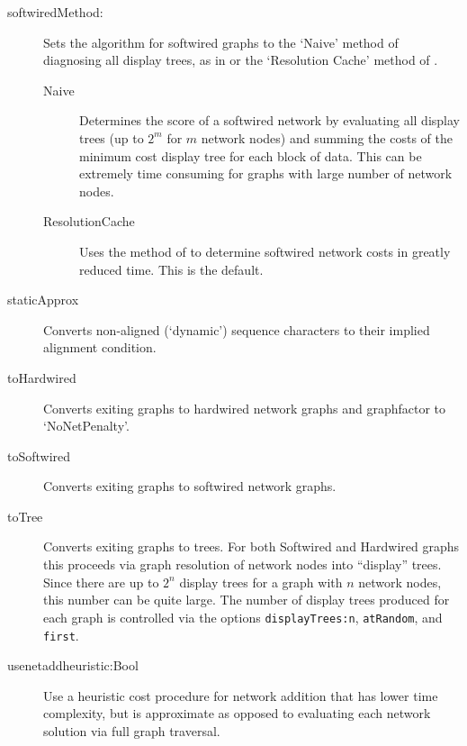 \begin{description}
		 \item[softwiredMethod:] Sets the algorithm for softwired graphs to the 
		 `Naive' method of diagnosing all display trees, as in \cite{Wheeler2015} or
		 the `Resolution Cache' method of \cite{WheelerandWashburn2023}.

				
			\begin{description}
					\item[Naive] Determines the score of a softwired network by evaluating all display trees
					(up to $2^m$ for $m$ network nodes) and summing the costs of the minimum cost display tree for each block
					of data.  This can be extremely time consuming for graphs with large number of network nodes.
					
					\item[ResolutionCache] Uses the method of \citep{Wheelerand Washburn2023} to determine
					softwired network costs in greatly reduced time.  This is the default.
					
			\end{description}
			
		\item[staticApprox] Converts non-aligned (`dynamic') sequence characters to their implied 
		alignment \citep{Wheeler2003, WashburnandWheeler2020} condition.
			
		\item[toHardwired] Converts exiting graphs to hardwired network graphs and graphfactor to `NoNetPenalty'.
			
		\item[toSoftwired] Converts exiting graphs to softwired network graphs.
			
		\item[toTree] Converts exiting graphs to trees. For both Softwired and Hardwired graphs 
		this proceeds via graph resolution of network nodes into ``display'' trees. Since there are up to 
		$2^n$ display trees for a graph with $n$ network nodes, this number can be quite large. 
		The number of display trees produced for each graph is controlled via the options 
		\texttt{displayTrees:n}, \texttt{atRandom}, and \texttt{first}. 
		
		
		\item[usenetaddheuristic:Bool] Use a heuristic cost procedure for network addition that has lower time complexity,
		but is approximate as opposed to evaluating each network solution via full graph traversal.
		
	\end{description}
			
